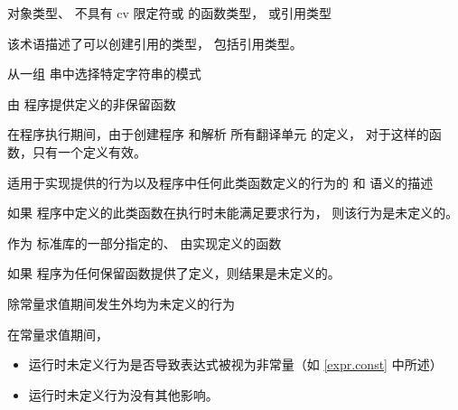 %
对象类型、
不具有 cv 限定符或  的函数类型，
或引用类型

\begin{defnote}
该术语描述了可以创建引用的类型，
包括引用类型。
\end{defnote}

从一组  串中选择特定字符串的模式

%
由 \Cpp{} 程序提供定义的非保留函数

\begin{defnote}
在程序执行期间，由于创建程序 和解析
所有翻译单元 的定义，
对于这样的函数，只有一个定义有效。
\end{defnote}

%
适用于实现提供的行为以及程序中任何此类函数定义的行为的
 和
 语义的描述

\begin{defnote}
如果 \Cpp{} 程序中定义的此类函数在执行时未能满足要求行为，
则该行为是未定义的。%
\end{defnote}

%
作为 \Cpp{} 标准库的一部分指定的、
由实现定义的函数

\begin{defnote}
如果 \Cpp{} 程序为任何保留函数提供了定义，则结果是未定义的。%
\end{defnote}

%
除常量求值期间发生外均为未定义的行为

\begin{defnote}
在常量求值期间，
\begin{itemize}
\item
{}
运行时未定义行为是否导致表达式被视为非常量（如 \ref{expr.const} 中所述）
\item
运行时未定义行为没有其他影响。
\end{itemize}
\end{defnote}

